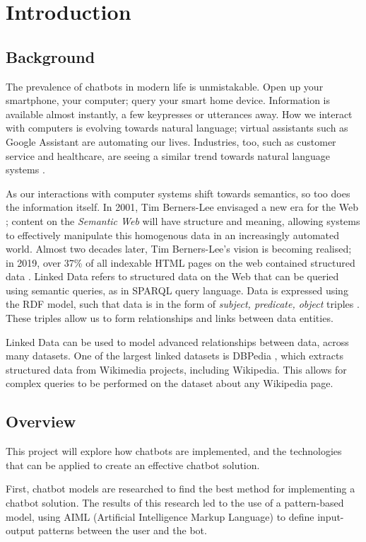 \chapter{Introduction}
\label{ch:intro}
\section{Background}
The prevalence of chatbots in modern life is unmistakable. Open up your smartphone, your computer; query your smart home device. Information is available almost instantly, a few keypresses or utterances away. How we interact with computers is evolving towards natural language; virtual assistants such as Google Assistant are automating our lives. Industries, too, such as customer service and healthcare, are seeing a similar trend towards natural language systems \cite{gvr2017}.

As our interactions with computer systems shift towards semantics, so too does the information itself. In 2001, Tim Berners-Lee envisaged a new era for the Web \cite{berners2001semantic}; content on the {\it Semantic Web} will have structure and meaning, allowing systems to effectively manipulate this homogenous data in an increasingly automated world. Almost two decades later, Tim Berners-Lee's vision is becoming realised; in 2019, over 37\% of all indexable HTML pages on the web contained structured data \cite{wdc2019crawl}. Linked Data refers to structured data on the Web that can be queried using semantic queries, as in SPARQL query language. Data is expressed using the RDF model, such that data is in the form of {\it subject, predicate, object} triples \cite{bizer2011linked}. These triples allow us to form relationships and links between data entities.

Linked Data can be used to model advanced relationships between data, across many datasets. One of the largest linked datasets is DBPedia \cite{dbpedia2019about}, which extracts structured data from Wikimedia projects, including Wikipedia. This allows for complex queries to be performed on the dataset about any Wikipedia page.

\section{Overview}
This project will explore how chatbots are implemented, and the technologies that can be applied to create an effective chatbot solution.

First, chatbot models are researched to find the best method for implementing a chatbot solution. The results of this research led to the use of a pattern-based model, using AIML (Artificial Intelligence Markup Language) to define input-output patterns between the user and the bot.


